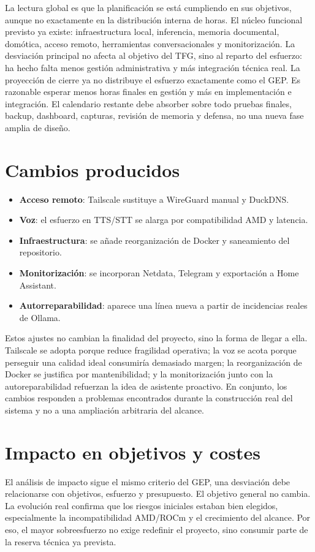 La lectura global es que la planificación se está cumpliendo en sus objetivos, aunque no exactamente en la distribución interna de horas. El núcleo funcional previsto ya existe: infraestructura local, inferencia, memoria documental, domótica, acceso remoto, herramientas conversacionales y monitorización. La desviación principal no afecta al objetivo del TFG, sino al reparto del esfuerzo: ha hecho falta menos gestión administrativa y más integración técnica real. La proyección de cierre ya no distribuye el esfuerzo exactamente como el GEP. Es razonable esperar menos horas finales en gestión y más en implementación e integración. El calendario restante debe absorber sobre todo pruebas finales, backup, dashboard, capturas, revisión de memoria y defensa, no una nueva fase amplia de diseño.

\section{Cambios producidos}
\begin{itemize}
  \item \textbf{Acceso remoto}: Tailscale sustituye a WireGuard manual y DuckDNS.
  \item \textbf{Voz}: el esfuerzo en TTS/STT se alarga por compatibilidad AMD y latencia.
  \item \textbf{Infraestructura}: se añade reorganización de Docker y saneamiento del repositorio.
  \item \textbf{Monitorización}: se incorporan Netdata, Telegram y exportación a Home Assistant.
  \item \textbf{Autorreparabilidad}: aparece una línea nueva a partir de incidencias reales de Ollama.
\end{itemize}

Estos ajustes no cambian la finalidad del proyecto, sino la forma de llegar a ella. Tailscale se adopta porque reduce fragilidad operativa; la voz se acota porque perseguir una calidad ideal consumiría demasiado margen; la reorganización de Docker se justifica por mantenibilidad; y la monitorización junto con la autoreparabilidad refuerzan la idea de asistente proactivo. En conjunto, los cambios responden a problemas encontrados durante la construcción real del sistema y no a una ampliación arbitraria del alcance.

\section{Impacto en objetivos y costes}
El análisis de impacto sigue el mismo criterio del GEP, una desviación debe relacionarse con objetivos, esfuerzo y presupuesto. El objetivo general no cambia. La evolución real confirma que los riesgos iniciales estaban bien elegidos, especialmente la incompatibilidad AMD/ROCm y el crecimiento del alcance. Por eso, el mayor sobreesfuerzo no exige redefinir el proyecto, sino consumir parte de la reserva técnica ya prevista.

